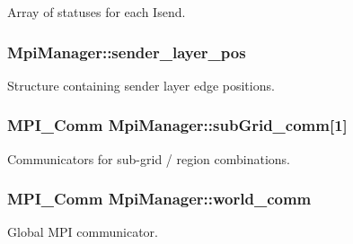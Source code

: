 Array of statuses for each Isend. 

\subsubsection[{\texorpdfstring{sender\+\_\+layer\+\_\+pos}{sender_layer_pos}}]{ Mpi\+Manager\+::sender\+\_\+layer\+\_\+pos}\hypertarget{class_mpi_manager_a0cb9f8f024ec0a186374995fb203ea1e}{}\label{class_mpi_manager_a0cb9f8f024ec0a186374995fb203ea1e}


Structure containing sender layer edge positions. 

\subsubsection[{\texorpdfstring{sub\+Grid\+\_\+comm}{subGrid_comm}}]{\setlength{\rightskip}{0pt plus 5cm}M\+P\+I\+\_\+\+Comm Mpi\+Manager\+::sub\+Grid\+\_\+comm\mbox{[}1\mbox{]}}\hypertarget{class_mpi_manager_a32921c381b76fb8f27d3334ebd1756cd}{}\label{class_mpi_manager_a32921c381b76fb8f27d3334ebd1756cd}


Communicators for sub-\/grid / region combinations. 

\subsubsection[{\texorpdfstring{world\+\_\+comm}{world_comm}}]{\setlength{\rightskip}{0pt plus 5cm}M\+P\+I\+\_\+\+Comm Mpi\+Manager\+::world\+\_\+comm}\hypertarget{class_mpi_manager_aec1ed834d1a8fa19f87499fb0d5cd332}{}\label{class_mpi_manager_aec1ed834d1a8fa19f87499fb0d5cd332}


Global M\+PI communicator. 




